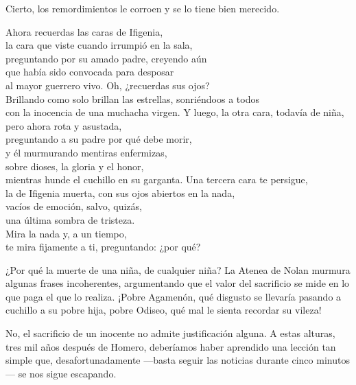 Cierto, los remordimientos le corroen y se lo tiene bien merecido.

\begin{versopropio}
Ahora recuerdas las caras de Ifigenia,\\
la cara que viste cuando irrumpió en la sala,\\
preguntando por su amado padre, creyendo aún\\
que había sido convocada para desposar\\
al mayor guerrero vivo. Oh, ¿recuerdas sus ojos?\\
Brillando como solo brillan las estrellas, sonriéndoos a todos\\
con la inocencia de una muchacha virgen.
\stanzabreak
Y luego, la otra cara, todavía de niña,\\
pero ahora rota y asustada,\\
preguntando a su padre por qué debe morir,\\
y él murmurando mentiras enfermizas,\\
sobre dioses, la gloria y el honor,\\
mientras hunde el cuchillo en su garganta.
\stanzabreak
Una tercera cara te persigue,\\
la de Ifigenia muerta, con sus ojos abiertos en la nada,\\
vacíos de emoción, salvo, quizás,\\
una última sombra de tristeza.\\
Mira la nada y, a un tiempo,\\
te mira fijamente a ti, preguntando: ¿por qué?
\end{versopropio}

¿Por qué la muerte de una niña, de cualquier niña? La Atenea de Nolan murmura algunas frases incoherentes, argumentando que el valor del sacrificio se mide en lo que paga el que lo realiza. ¡Pobre Agamenón, qué disgusto se llevaría pasando a cuchillo a su pobre hija, pobre Odiseo, qué mal le sienta recordar su vileza!

No, el sacrificio de un inocente no admite justificación alguna. A estas alturas, tres mil años después de Homero, deberíamos haber aprendido una lección tan simple que, desafortunadamente ---basta seguir las noticias durante cinco minutos--- se nos sigue escapando.

